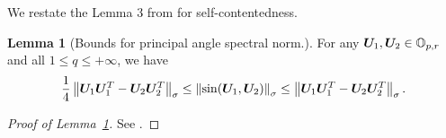 \documentclass[lettersize,journal]{IEEEtran}
\theoremstyle{definition}
\newtheorem{lem}{Lemma}
\theoremstyle{definition}
\newtheorem{conjecture}{Conjecture}
\newcommand{\of}[1]{\left(#1\right)}
\begin{document}



We restate the Lemma 3 from \cite{zhang2018tensor} for self-contentedness. 
\begin{lem}[Bounds for principal angle spectral norm.]\label{lem:equivalence_qnorm}
    For any $\bm{U}_1, \bm{U}_2 \in \mathbb{O}_{p,r}$ and all $1 \leq q \leq +\infty$, we have
    \begin{align}
        \frac{1}{4} \left\lVert\bm{U}_1 \bm{U}_1^T - \bm{U}_2 \bm{U}_2^T\right\rVert_{\sigma} \leq \left\lVert\sin(\bm{U}_1, \bm{U}_2) \right\rVert_{\sigma} \leq  \left\lVert\bm{U}_1 \bm{U}_1^T - \bm{U}_2 \bm{U}_2^T\right\rVert_{\sigma}.
    \end{align}
\end{lem}

\begin{proof}[Proof of Lemma~\ref{lem:equivalence_qnorm}] See \citet[Proof of Lemma 3]{zhang2018tensor}.
\end{proof}
\end{document}
